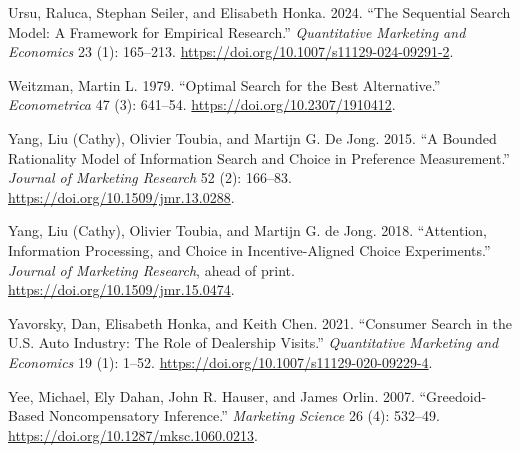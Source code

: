 \documentclass[
  letterpaper,
  DIV=11,
  numbers=noendperiod]{scrartcl}
\newlength{\cslhangindent}
\newenvironment{CSLReferences}[2] %
 {\begin{list}{}{%
  \setlength{\itemindent}{0pt}
  \setlength{\leftmargin}{0pt}
  \setlength{\parsep}{0pt}
  \ifodd #1
   \setlength{\leftmargin}{\cslhangindent}
   \setlength{\itemindent}{-1\cslhangindent}
  \fi
  \setlength{\itemsep}{#2\baselineskip}}}
 {\end{list}}
\begin{document}
\begin{CSLReferences}{1}{1}
Ursu, Raluca, Stephan Seiler, and Elisabeth Honka. 2024. {``The
Sequential Search Model: A Framework for Empirical Research.''}
\emph{Quantitative Marketing and Economics} 23 (1): 165--213.
\url{https://doi.org/10.1007/s11129-024-09291-2}.

Weitzman, Martin L. 1979. {``Optimal Search for the Best Alternative.''}
\emph{Econometrica} 47 (3): 641--54.
\url{https://doi.org/10.2307/1910412}.

Yang, Liu (Cathy), Olivier Toubia, and Martijn G. De Jong. 2015. {``A
Bounded Rationality Model of Information Search and Choice in Preference
Measurement.''} \emph{Journal of Marketing Research} 52 (2): 166--83.
\url{https://doi.org/10.1509/jmr.13.0288}.

Yang, Liu (Cathy), Olivier Toubia, and Martijn G. de Jong. 2018.
{``Attention, Information Processing, and Choice in Incentive-Aligned
Choice Experiments.''} \emph{Journal of Marketing Research}, ahead of
print. \url{https://doi.org/10.1509/jmr.15.0474}.

Yavorsky, Dan, Elisabeth Honka, and Keith Chen. 2021. {``Consumer Search
in the {U.S.} Auto Industry: The Role of Dealership Visits.''}
\emph{Quantitative Marketing and Economics} 19 (1): 1--52.
\url{https://doi.org/10.1007/s11129-020-09229-4}.

Yee, Michael, Ely Dahan, John R. Hauser, and James Orlin. 2007.
{``Greedoid-Based Noncompensatory Inference.''} \emph{Marketing Science}
26 (4): 532--49. \url{https://doi.org/10.1287/mksc.1060.0213}.

\end{CSLReferences}
\end{document}
